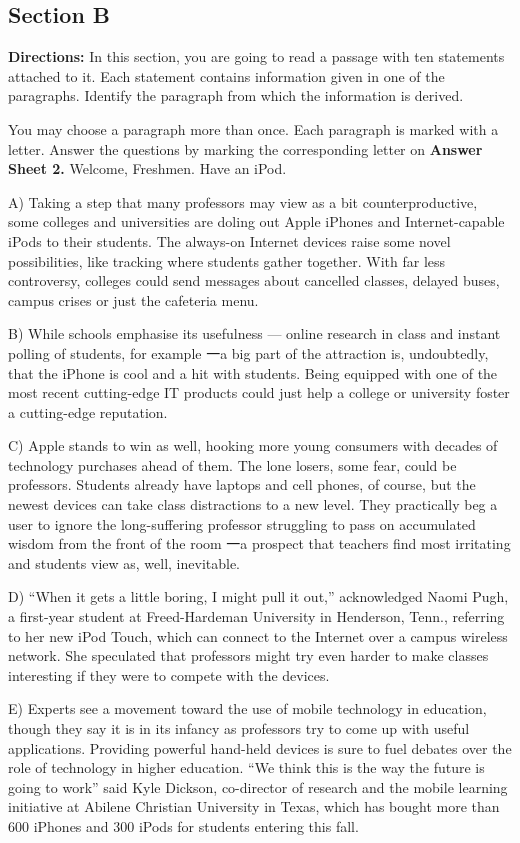 \documentclass[UTF8,11pt]{ctexart}
\begin{document}
\subsection*{\textbf{Section B}}


\textbf{Directions:} In this section, you are going to read a passage with ten statements attached to it. Each statement contains information given in one of the paragraphs. Identify the paragraph from which the information is derived.


You may choose a paragraph more than once. Each paragraph is marked with a letter. Answer the questions by marking the corresponding letter on\textbf{ Answer Sheet 2.} Welcome, Freshmen. Have an iPod.


A) Taking a step that many professors may view as a bit counterproductive, some colleges and universities are doling out Apple iPhones and Internet-capable iPods to their students. The always-on Internet devices raise some novel possibilities, like tracking where students gather together. With far less controversy, colleges could send messages about cancelled classes, delayed buses, campus crises or just the cafeteria menu.


B) While schools emphasise its usefulness — online research in class and instant polling of students, for example 一a big part of the attraction is, undoubtedly, that the iPhone is cool and a hit with students. Being equipped with one of the most recent cutting-edge IT products could just help a college or university foster a cutting-edge reputation.


C) Apple stands to win as well, hooking more young consumers with decades of technology purchases ahead of them. The lone losers, some fear, could be professors. Students already have laptops and cell phones, of course, but the newest devices can take class distractions to a new level. They practically beg a user to ignore the long-suffering professor struggling to pass on accumulated wisdom from the front of the room 一a prospect that teachers find most irritating and students view as, well, inevitable.


D) “When it gets a little boring, I might pull it out,” acknowledged Naomi Pugh, a first-year student at Freed-Hardeman University in Henderson, Tenn., referring to her new iPod Touch, which can connect to the Internet over a campus wireless network. She speculated that professors might try even harder to make classes interesting if they were to compete with the devices.


E) Experts see a movement toward the use of mobile technology in education, though they say it is in its infancy as professors try to come up with useful applications. Providing powerful hand-held devices is sure to fuel debates over the role of technology in higher education. “We think this is the way the future is going to work” said Kyle Dickson, co-director of research and the mobile learning initiative at Abilene Christian University in Texas, which has bought more than 600 iPhones and 300 iPods for students entering this fall.
\end{document}
